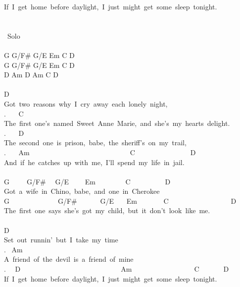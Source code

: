 {If\ I\ get\ home\ before\ daylight,\ I\ just\ might\ get\ some\ sleep\ tonight.\\
\\
\\
\lbrack\ Solo\rbrack\\
\\
G G/F\# G/E Em C D\\
G G/F\# G/E Em C D\\
D Am D Am C D\\
\\
D\\
Got\ two\ reasons\ why\ I\ cry\ away\ each\ lonely\ night,\\
. \ \ \ C\\
The\ first\ one's\ named\ Sweet\ Anne\ Marie,\ and\ she's\ my\ hearts\ delight.\\
. \ \ \ D\\
The\ second\ one\ is\ prison,\ babe,\ the\ sheriff's\ on\ my\ trail,\\
. \ \ \ Am\ \ \ \ \ \ \ \ \ \ \ \ \ \ \ \ \ \ \ \ \ \ \ \ \ \ \ \ \ C\ \ \ \ \ \ \ \ \ \ \ \ \ \ \ \ D\\
And\ if\ he\ catches\ up\ with\ me,\ I'll\ spend\ my\ life\ in\ jail.\\
\\
G\ \ \ \ \ G/F\# \ \ G/E \ \ \ \ Em \ \ \ \ \ \ \ \ C\ \ \ \ \ \ \ \ \ \ D\\
Got\ a\ wife\ in\ Chino,\ babe,\ and\ one\ in\ Cherokee\\
G\ \ \ \ \ \ \ \ \ \ \ \ \ \ G/F\# \ \ \ \ \ \ G/E \ \ \ Em \ \ \ \ \ \ \ C\ \ \ \ \ \ \ \ \ \ \ \ \ \ \ \ \ \ D\\
The\ first\ one\ says\ she's\ got\ my\ child,\ but\ it\ don't\ look\ like\ me.\\
\\
D\\
Set\ out\ runnin'\ but\ I\ take\ my\ time\\
. \ Am\\
A\ friend\ of\ the\ devil\ is\ a\ friend\ of\ mine\\
. \ \ D\ \ \ \ \ \ \ \ \ \ \ \ \ \ \ \ \ \ \ \ \ \ \ \ \ \ \ \ \ Am\ \ \ \ \ \ \ \ \ \ \ \ \ \ \ \ \ \ C\ \ \ \ \ \ \ D\\
If\ I\ get\ home\ before\ daylight,\ I\ just\ might\ get\ some\ sleep\ tonight.\\
\\
}

